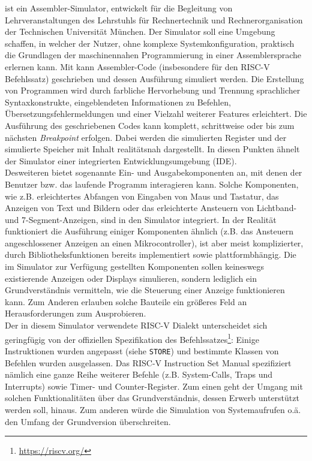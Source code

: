 \erasim ist ein Assembler-Simulator, entwickelt für die Begleitung von Lehrveranstaltungen des Lehrstuhls für Rechnertechnik und Rechnerorganisation der Technischen Universität München. Der Simulator soll eine Umgebung schaffen, in welcher der Nutzer, ohne komplexe Systemkonfiguration, praktisch die Grundlagen der maschinennahen Programmierung in einer Assemblersprache erlernen kann.
Mit \erasim kann Assembler-Code (insbesondere für den RISC-V Befehlssatz) geschrieben und dessen Ausführung simuliert werden. Die Erstellung von Programmen wird durch farbliche Hervorhebung und Trennung sprachlicher Syntaxkonstrukte, eingeblendeten Informationen zu Befehlen, Übersetzungsfehlermeldungen und einer Vielzahl weiterer Features erleichtert. Die Ausführung des geschriebenen Codes kann komplett, schrittweise oder bis zum nächsten \emph{Breakpoint} erfolgen. Dabei werden die simulierten Register und der simulierte Speicher mit Inhalt realitätsnah dargestellt. In diesen Punkten ähnelt der Simulator einer integrierten Entwicklungsumgebung (IDE).\\
Desweiteren bietet \erasim sogenannte Ein- und Ausgabekomponenten an, mit denen der Benutzer bzw. das laufende Programm interagieren kann. Solche Komponenten, wie z.B. erleichtertes Abfangen von Eingaben von Maus und Tastatur, das Anzeigen von Text und Bildern oder das erleichterte Ansteuern von Lichtband- und 7-Segment-Anzeigen, sind in den Simulator integriert. In der Realität funktioniert die Ausführung einiger Komponenten ähnlich (z.B. das Ansteuern angeschlossener Anzeigen an einen Mikrocontroller), ist aber meist komplizierter, durch Bibliotheksfunktionen bereits implementiert sowie plattformbhängig. Die im Simulator zur Verfügung gestellten Komponenten sollen keineswegs existierende Anzeigen oder Displays simulieren, sondern lediglich ein Grundverständnis vermitteln, wie die Steuerung einer Anzeige funktionieren kann. Zum Anderen erlauben solche Bauteile ein größeres Feld an Herausforderungen zum Ausprobieren.\\
Der in diesem Simulator verwendete RISC-V Dialekt unterscheidet sich geringfügig von der offiziellen Spezifikation des Befehlssatzes\footnote{\url{https://riscv.org/}}: Einige Instruktionen wurden angepasst (siehe \texttt{STORE}) und bestimmte Klassen von Befehlen wurden ausgelassen. Das RISC-V Instruction Set Manual spezifiziert nämlich eine ganze Reihe weiterer Befehle (z.B. System-Calls, Traps und Interrupts) sowie Timer- und Counter-Register. Zum einen geht der Umgang mit solchen Funktionalitäten über das Grundverständnis, dessen Erwerb unterstützt werden soll, hinaus. Zum anderen würde die Simulation von Systemaufrufen o.ä. den Umfang der Grundversion überschreiten.\\

